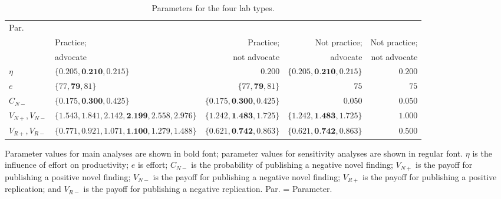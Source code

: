 \documentclass[meta, authordate,issue]{jote-new-article}
\begin{document}
%
\begin{table}[!t]
  \begin{fullwidth}
    \begin{threeparttable}
      \caption{Parameters for the four lab types.}
      \label{tab:parameters}
      \begin{tabularx}{\textwidth}{@{}l>{\arraybackslash\RaggedLeft}Xrrr@{}}
        \toprule
        Par.             & \multicolumn{4}{c}{Value}                                                                                                                        \\
        \cmidrule{2-5}
                         & Practice;                                              & Practice;                          & Not practice;                      & Not practice; \\
                         & advocate                                               & not advocate                       & advocate                           & not advocate  \\
        \midrule
        $\eta$           & $\{0.205, \textbf{0.210}, 0.215\}$                     & $0.200$                            & $\{0.205, \textbf{0.210}, 0.215\}$ & $0.200$       \\
        $e$              & $\{77, \textbf{79}, 81\}$                              & $\{77, \textbf{79}, 81\}$          & $75$                               & $75$          \\
        $C_{N-}$         & $\{0.175, \textbf{0.300}, 0.425\}$                     & $\{0.175, \textbf{0.300}, 0.425\}$ & $0.050$                            & $0.050$       \\
        $V_{N+}, V_{N-}$ & $\{1.543, 1.841, 2.142,\textbf{2.199}, 2.558, 2.976\}$ & $\{1.242, \textbf{1.483}, 1.725\}$ & $\{1.242, \textbf{1.483}, 1.725\}$ & $1.000$       \\

        $V_{R+}, V_{R-}$ & $\{0.771, 0.921, 1.071,\textbf{1.100}, 1.279, 1.488\}$ & $\{0.621, \textbf{0.742}, 0.863\}$ & $\{0.621, \textbf{0.742}, 0.863\}$ & $0.500$       \\
        \midrule
      \end{tabularx}
      Parameter values for main analyses are shown in bold font; parameter values for sensitivity analyses are shown in regular font. $\eta$ is the influence of effort on productivity; $e$ is effort; $C_{N-}$ is the probability of publishing a negative novel finding; $V_{N+}$ is the payoff for publishing a positive novel finding; $V_{N-}$ is the payoff for publishing a negative novel finding; $V_{R+}$ is the payoff for publishing a positive replication; and $V_{R-}$ is the payoff for publishing a negative replication. Par. = Parameter.
    \end{threeparttable}
  \end{fullwidth}
\end{table}
%
\end{document}

